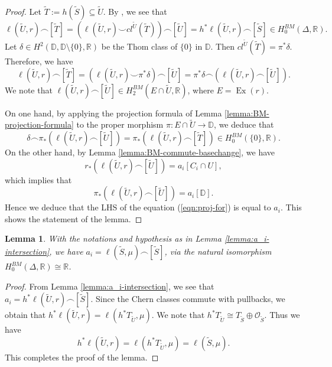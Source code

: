 \documentclass[12pt]{amsart}
\newcommand{\<}{\leq}
\newtheorem{lemma}[theorem]{Lemma}
\theoremstyle{remark}
\theoremstyle{definition}
\theoremstyle{definition}
\numberwithin{equation}{section}
\theoremstyle{definition}
\theoremstyle{definition}
\def\Ex{\operatorname{Ex}}
\begin{document}
\begin{proof} 
Let $\widetilde{T}:=h(\widetilde{S}) \subseteq \widetilde{U}$. 
By \cite[Equation (8), Section 19.1]{Fulton}, we see that 
\[
\ell(\widetilde{U}, r) \smallfrown [\widetilde{T}] =
 (\ell(\widetilde{U}, r) \smallsmile cl^{\widetilde{U}}(\widetilde{T}) ) \smallfrown [\widetilde{U}]=
h^*\ell(\widetilde{U}, r) \smallfrown [\widetilde{S}] \in H_0^{BM}(\Delta, \mathbb{R}).
\]
Let $\delta \in H^2(\mathbb{D}, \mathbb{D}\setminus \{ 0 \}, \mathbb{R})$ be the Thom class of  $\{0\}$ in $\mathbb{D}$.   
Then $ cl^{\widetilde{U}}(\widetilde{T})  = \pi^*\delta$. 
Therefore, we have 
\[
\ell(\widetilde{U}, r) \smallfrown [\widetilde{T}]  
= (\ell(\widetilde{U}, r) \smallsmile \pi^* \delta) \smallfrown [\widetilde{U}]
= \pi^*\delta \smallfrown (\ell(\widetilde{U}, r) \smallfrown  [\widetilde{U}] ).
\]
We note that $ \ell(\widetilde{U}, r) \smallfrown  [\widetilde{U}]  \in H^{BM}_2(E\cap \widetilde{U}, \mathbb{R})$, where $E=\Ex(r)$.  

On one hand, by applying the projection formula of Lemma \ref{lemma:BM-projection-formula} to the proper morphism $\pi\colon E\cap \widetilde{U} \to \mathbb{D}$, we deduce that 
\begin{equation} \label{eqn:proj-for}
 \delta \smallfrown \pi_*(\ell(\widetilde{U}, r) \smallfrown  [\widetilde{U}] )
 =  \pi_*(\ell(\widetilde{U}, r) \smallfrown [\widetilde{T}])\in H^{BM}_0(\{0\}, \mathbb{R}).   
\end{equation}
On the other hand, by Lemma \ref{lemma:BM-commute-basechange}, we have 
\[r_*(\ell(\widetilde{U}, r) \smallfrown  [\widetilde{U}] ) = a_i[C_i\cap U],\]
which implies that 
\[\pi_*(\ell(\widetilde{U}, r) \smallfrown  [\widetilde{U}] )   = a_i[ \mathbb{D}].\] 
Hence we deduce that the LHS of the equation (\ref{eqn:proj-for})  is equal to $a_i$. 
This shows the statement of the lemma.
\end{proof}




\begin{lemma}
\label{lemma:c2-calculation}
With the notations and hypothesis as in Lemma \ref{lemma:a_i-intersection}, we have $a_i = \ell(\widetilde{S}, \mu)\smallfrown [\widetilde{S}]$,  \textit{via} the natural isomorphism $H_0^{BM}(\Delta, \mathbb{R}) \cong \mathbb{R}$.  
\end{lemma}

\begin{proof} 
From Lemma \ref{lemma:a_i-intersection}, we see that 
$a_i=h^*\ell(\widetilde{U}, r) \smallfrown [\widetilde{S}]$.  
Since the Chern classes commute with pullbacks, we obtain that 
$h^*\ell(\widetilde{U}, r)  = \ell(h^*T_{\widetilde{U}}  , \mu)$.  
We note that  $h^*T_{\widetilde{U}} \cong T_{\widetilde{S}} \oplus \mathcal{O}_{\widetilde{S}}$.
Thus we have 
\[
h^*\ell(\widetilde{U}, r)  =  \ell( h^*T_{\widetilde{U}}, \mu) = \ell(\widetilde{S}, \mu).
\] 
This completes the proof of the lemma.
\end{proof}
\end{document}
